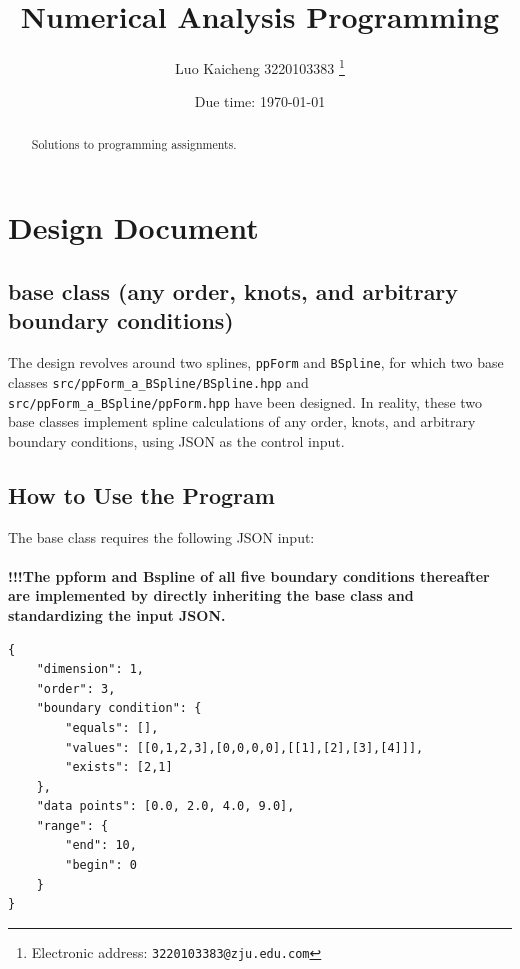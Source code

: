 \documentclass[a4paper]{article}
\begin{document}
\title{Numerical Analysis Programming}

\author{Luo Kaicheng 3220103383
  \thanks{Electronic address: \texttt{3220103383@zju.edu.com}}}

\date{Due time: \today}

\maketitle

\begin{abstract}
    Solutions to programming assignments.
\end{abstract}

\section*{Design Document}

\subsection*{base class (any order, knots, and arbitrary boundary conditions)}
The design revolves around two splines, \texttt{ppForm} and \texttt{BSpline}, for which two base classes \texttt{src/ppForm\_a\_BSpline/BSpline.hpp} and \texttt{src/ppForm\_a\_BSpline/ppForm.hpp} have been designed. In reality, these two base classes implement spline calculations of any order, knots, and arbitrary boundary conditions, using JSON as the control input.

\subsection*{How to Use the Program}

The base class requires the following JSON input:\\
\\
\textbf{!!!The ppform and Bspline of all five boundary conditions thereafter are implemented by directly inheriting the base class and standardizing the input JSON.}

\begin{verbatim}
{
    "dimension": 1,
    "order": 3,
    "boundary condition": {
        "equals": [],
        "values": [[0,1,2,3],[0,0,0,0],[[1],[2],[3],[4]]],
        "exists": [2,1]
    },
    "data points": [0.0, 2.0, 4.0, 9.0],
    "range": {
        "end": 10,
        "begin": 0
    }
}
\end{verbatim}
\end{document}
